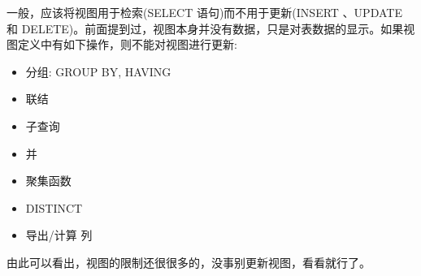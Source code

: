 一般，应该将视图用于检索(SELECT 语句)而不用于更新(INSERT 、UPDATE 和 DELETE)。前面提到过，视图本身并没有数据，只是对表数据的显示。如果视图定义中有如下操作，则不能对视图进行更新:

\begin{itemize}
    \item 分组: GROUP BY, HAVING
    \item 联结
    \item 子查询
    \item 并
    \item 聚集函数
    \item DISTINCT
    \item 导出/计算 列
\end{itemize}

由此可以看出，视图的限制还很很多的，没事别更新视图，看看就行了。

\newpage